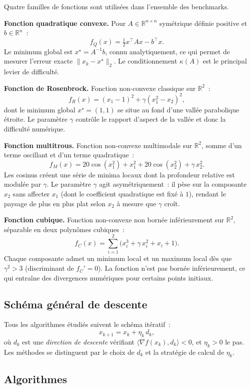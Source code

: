 \documentclass[10pt,a4paper]{article}
\begin{document}
Quatre familles de fonctions sont utilisées dans l'ensemble des benchmarks.

\textbf{Fonction quadratique convexe.} Pour $A \in \mathbb{R}^{n \times n}$ symétrique définie positive et $b \in \mathbb{R}^n$~:
\[
  f_Q(x) = \tfrac{1}{2}x^\top A x - b^\top x.
\]
Le minimum global est $x^\star = A^{-1}b$, connu analytiquement, ce qui permet de mesurer l'erreur exacte $\|x_k - x^\star\|_2$. Le conditionnement $\kappa(A)$ est le principal levier de difficulté.

\textbf{Fonction de Rosenbrock.} Fonction non-convexe classique sur $\mathbb{R}^2$~:
\[
  f_R(x) = (x_1 - 1)^2 + \gamma(x_1^2 - x_2)^2,
\]
dont le minimum global $x^\star = (1,1)$ se situe au fond d'une vallée parabolique étroite. Le paramètre $\gamma$ contrôle le rapport d'aspect de la vallée et donc la difficulté numérique.

\textbf{Fonction multitrous.} Fonction non-convexe multimodale sur $\mathbb{R}^2$, somme d'un terme oscillant et d'un terme quadratique~:
\[
  f_M(x) = 20\cos(x_1^2) + x_1^2 + 20\cos(x_2^2) + \gamma\, x_2^2.
\]
Les cosinus créent une série de minima locaux dont la profondeur relative est modulée par $\gamma$. Le paramètre $\gamma$ agit asymétriquement~: il pèse sur la composante $x_2$ sans affecter $x_1$ (dont le coefficient quadratique est fixé à $1$), rendant le paysage de plus en plus plat selon $x_2$ à mesure que $\gamma$ croît.

\textbf{Fonction cubique.} Fonction non-convexe non bornée inférieurement sur $\mathbb{R}^2$, séparable en deux polynômes cubiques~:
\[
  f_C(x) = \sum_{i=1}^{2}\bigl(x_i^3 + \gamma\, x_i^2 + x_i + 1\bigr).
\]
Chaque composante admet un minimum local et un maximum local dès que $\gamma^2 > 3$ (discriminant de $f_C' = 0$). La fonction n'est pas bornée inférieurement, ce qui entraîne des divergences numériques pour certains points initiaux.

\subsection{Schéma général de descente}\label{sec:schema}

Tous les algorithmes étudiés suivent le schéma itératif~:
\[
  x_{k+1} = x_k + \eta_k \, d_k,
\]
où $d_k$ est une \emph{direction de descente} vérifiant $\langle \nabla f(x_k), d_k \rangle < 0$, et $\eta_k > 0$ le pas. Les méthodes se distinguent par le choix de $d_k$ et la stratégie de calcul de $\eta_k$.

\subsection{Algorithmes}\label{sec:algo}
\end{document}
